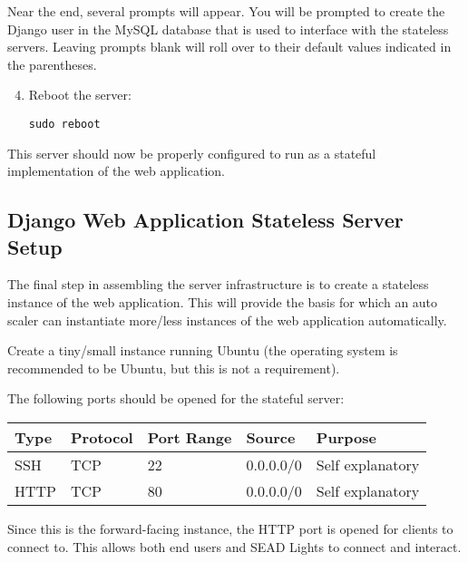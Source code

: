 \documentclass[letterpaper,10pt,english]{sphinxmanual}
\begin{document}
Near the end, several prompts will appear. You will be prompted to create the Django user in the MySQL database that is used to interface with the stateless servers. Leaving prompts blank will roll over to their default values indicated in the parentheses.
\begin{enumerate}
\setcounter{enumi}{3}
\item {} 
Reboot the server:

\begin{Verbatim}[commandchars=\\\{\}]
sudo reboot
\end{Verbatim}

\end{enumerate}

This server should now be properly configured to run as a stateful implementation of the web application.


\subsection{Django Web Application Stateless Server Setup}
\label{installation:django-web-application-stateless-server-setup}
The final step in assembling the server infrastructure is to create a stateless instance of the web application. This will provide the basis for which an auto scaler can instantiate more/less instances of the web application automatically.

Create a tiny/small instance running Ubuntu (the operating system is recommended to be Ubuntu, but this is not a requirement).

The following ports should be opened for the stateful server:

\begin{tabulary}{\linewidth}{|L|L|L|L|L|}
\hline
\textsf{\relax 
Type
} & \textsf{\relax 
Protocol
} & \textsf{\relax 
Port Range
} & \textsf{\relax 
Source
} & \textsf{\relax 
Purpose
}\\
\hline
SSH
 & 
TCP
 & 
22
 & 
0.0.0.0/0
 & 
Self explanatory
\\
\hline
HTTP
 & 
TCP
 & 
80
 & 
0.0.0.0/0
 & 
Self explanatory
\\
\hline\end{tabulary}


Since this is the forward-facing instance, the HTTP port is opened for clients to connect to. This allows both end users and SEAD Lights to connect and interact.
\end{document}
